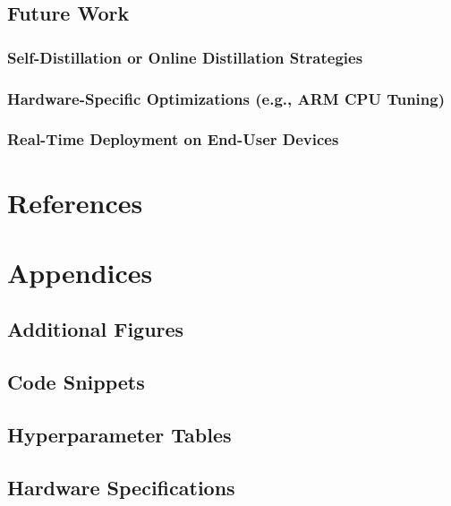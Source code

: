 \documentclass[a4paper,12pt]{report}
\begin{document}
\section{Future Work}
\subsection{Self-Distillation or Online Distillation Strategies}
\subsection{Hardware-Specific Optimizations (e.g., ARM CPU Tuning)}
\subsection{Real-Time Deployment on End-User Devices}


\chapter{References}
\chapter{Appendices}
\section{Additional Figures}
\section{Code Snippets}
\section{Hyperparameter Tables}
\section{Hardware Specifications}
\end{document}
